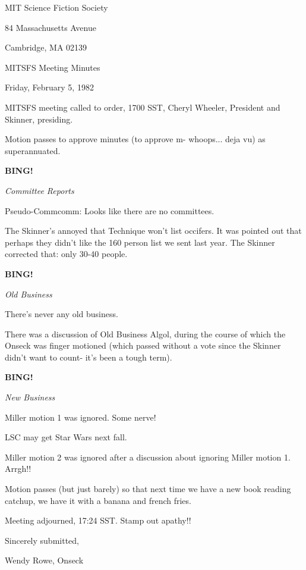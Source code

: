 \documentclass[12pt]{article}
\newcommand{\bing}{{\bf BING!} }
\newcommand{\goto}[1]{\bing \vskip 12pt \centerline{{\em{#1}}}}
\begin{document}
\begin{center}

MIT Science Fiction Society 

84 Massachusetts Avenue

Cambridge, MA 02139

\vspace{12pt}

MITSFS Meeting Minutes 

Friday, February 5, 1982

\end{center}
 
\vspace{18pt}

\setlength{\parskip}{6pt}

\noindent
MITSFS meeting called to order, 1700 SST,
Cheryl Wheeler, President and Skinner, presiding.

Motion passes to approve minutes (to approve m- whoops... deja vu) as superannuated.

\goto{Committee Reports}

Pseudo-Commcomm: Looks like there are no committees.

The Skinner's annoyed that Technique won't list occifers. It was pointed out that perhaps they didn't like the 160 person list we sent last year. The Skinner corrected that: only 30-40 people.

\goto{Old Business}

There's never any old business.

There was a discussion of Old Business Algol, during the course of which the Onseck was finger motioned (which passed without a vote since the Skinner didn't want to count- it's been a tough term).

\goto{New Business}

Miller motion 1 was ignored. Some nerve!

LSC may get Star Wars next fall.

Miller motion 2 was ignored after a discussion about ignoring Miller motion 1. Arrgh!!

Motion passes (but just barely) so that next time we have a new book reading catchup, we have it with a banana and french fries.

\vspace{12pt}

\noindent
Meeting adjourned, 17:24 SST. Stamp out apathy!!

\vspace{18pt}

\centerline{Sincerely submitted,}
\centerline{Wendy Rowe, Onseck}
\end{document}
